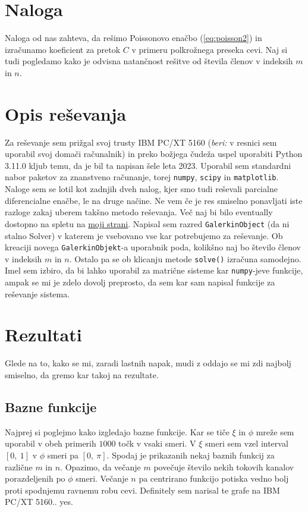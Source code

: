 \documentclass[a4paper]{article}
\begin{document}
\section{Naloga}
Naloga od nas zahteva, da rešimo Poissonovo enačbo (\ref{eq:poisson2}) in izračunamo koeficient za 
pretok $C$ v primeru polkrožnega preseka cevi. Naj si tudi pogledamo kako je odvisna natančnost
rešitve od števila členov v indeksih $m$ in $n$.\\
\section{Opis reševanja}
Za reševanje sem prižgal svoj trusty IBM PC/XT 5160 (\textit{beri:} v resnici sem uporabil svoj domači računalnik) in 
preko božjega čudeža uspel uporabiti Python 3.11.0 kljub temu, da je bil ta napisan šele leta 2023. Uporabil sem 
standardni nabor paketov za znanstveno računanje, torej \texttt{numpy}, \texttt{scipy} in \texttt{matplotlib}.\\

Naloge sem se lotil kot zadnjih dveh nalog, kjer smo tudi reševali parcialne diferencialne enačbe, le na druge 
načine. Ne vem če je res smiselno ponavljati iste razloge zakaj uberem takšno metodo reševanja. Več naj bi bilo eventually
dostopno na spletu na \href{https://pengu5055.github.io/}{moji strani}. Napisal sem razred \texttt{GalerkinObject} 
(da ni stalno Solver) v katerem je vsebovano vse kar potrebujemo za reševanje. Ob kreaciji novega \texttt{GalerkinObjekt}-a 
uporabnik poda, kolikšno naj bo število členov v indeksih $m$ in $n$. Ostalo pa se ob klicanju metode \texttt{solve()} 
izračuna samodejno. Imel sem izbiro, da bi lahko uporabil za matrične sisteme kar \texttt{numpy}-jeve funkcije, 
ampak se mi je zdelo dovolj preprosto, da sem kar sam napisal funkcije za reševanje sistema.

\section{Rezultati}
Glede na to, kako se mi, zaradi lastnih napak, mudi z oddajo se mi zdi najbolj smiselno, da gremo kar takoj na rezultate.

\subsection{Bazne funkcije}
Najprej si poglejmo kako izgledajo bazne funkcije. Kar se tiče $\xi$ in $\phi$ mreže sem uporabil v obeh primerih
$1000$ točk v vsaki smeri. V $\xi$ smeri sem vzel interval $[0,\>1]$ v $\phi$ smeri pa $[0,\>\pi]$. Spodaj je prikazanih nekaj 
baznih funkcij za različne $m$ in $n$. Opazimo, da večanje $m$ povečuje število nekih tokovih kanalov porazdeljenih po 
$\phi$ smeri. Večanje $n$ pa centrirano funkcijo potiska vedno bolj proti spodnjemu ravnemu robu cevi. Definitely sem
narisal te grafe na IBM PC/XT 5160.. yes.
\end{document}
